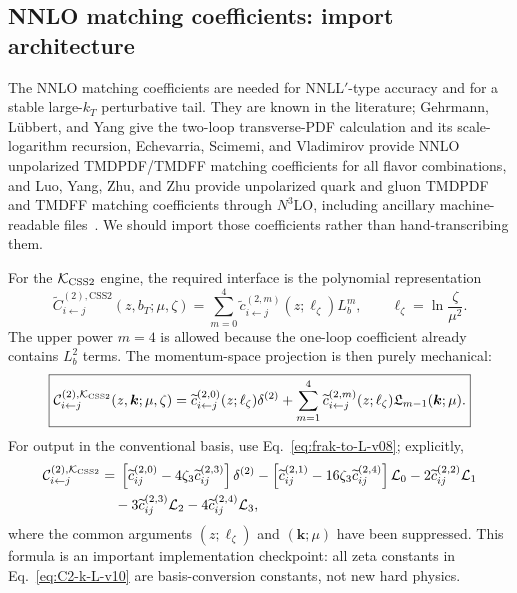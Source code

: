 \documentclass[11pt]{article}
\newcommand{\bk}{\bm{k}}
\newcommand{\deltaT}{\delta^{(2)}}
\newcommand{\KCSS}{\mathcal K_{\rm CSS2}}
\newcommand{\CSS}{\mathrm{CSS2}}
\begin{document}
\subsection{NNLO matching coefficients: import architecture}

The NNLO matching coefficients are needed for NNLL$'$-type accuracy and for a stable
large-$k_T$ perturbative tail.  They are known in the literature; Gehrmann, L\"ubbert, and Yang give the two-loop transverse-PDF calculation and its
scale-logarithm recursion, Echevarria, Scimemi, and Vladimirov provide NNLO
unpolarized TMDPDF/TMDFF matching coefficients for all flavor combinations, and Luo,
Yang, Zhu, and Zhu provide unpolarized quark and gluon TMDPDF and TMDFF matching
coefficients through $N^3$LO, including ancillary machine-readable
files~\cite{GehrmannLuebbertYang2014,EchevarriaScimemiVladimirov2016,LuoYangZhuZhu2021}.
We should import those coefficients rather than hand-transcribing them.

For the $\KCSS$ engine, the required interface is the polynomial representation
\begin{equation}
  \widetilde C_{i\leftarrow j}^{(2),\CSS}(z,b_T;\mu,\zeta)
  =\sum_{m=0}^{4}
    \widetilde c_{i\leftarrow j}^{(2,m)}(z;\ell_\zeta)
    L_b^m,
  \qquad
  \ell_\zeta=\ln\frac{\zeta}{\mu^2}.
  \label{eq:C2-b-poly-v10}
\end{equation}
The upper power $m=4$ is allowed because the one-loop coefficient already contains
$L_b^2$ terms.  The momentum-space projection is then purely mechanical:
\begin{equation}
  \boxed{
  \mathcal C_{i\leftarrow j}^{(2),\KCSS}(z,\bk;\mu,\zeta)
  =\widetilde c_{i\leftarrow j}^{(2,0)}(z;\ell_\zeta)\deltaT
  +\sum_{m=1}^{4}
    \widetilde c_{i\leftarrow j}^{(2,m)}(z;\ell_\zeta)
    \mathfrak L_{m-1}(\bk;\mu).}
  \label{eq:C2-k-frak-v10}
\end{equation}
For output in the conventional basis, use Eq.~\eqref{eq:frak-to-L-v08}; explicitly,
\begin{align}
  \mathcal C_{i\leftarrow j}^{(2),\KCSS}
  &={}
  \left[\widetilde c^{(2,0)}_{ij}-4\zeta_3\widetilde c^{(2,3)}_{ij}\right]\deltaT
  -\left[\widetilde c^{(2,1)}_{ij}-16\zeta_3\widetilde c^{(2,4)}_{ij}\right]
    \mathcal L_0
  -2\widetilde c^{(2,2)}_{ij}\mathcal L_1
  \notag\\
  &\quad
  -3\widetilde c^{(2,3)}_{ij}\mathcal L_2
  -4\widetilde c^{(2,4)}_{ij}\mathcal L_3,
  \label{eq:C2-k-L-v10}
\end{align}
where the common arguments $(z;\ell_\zeta)$ and $(\bk;\mu)$ have been suppressed.  This
formula is an important implementation checkpoint: all zeta constants in
Eq.~\eqref{eq:C2-k-L-v10} are basis-conversion constants, not new hard physics.
\end{document}
